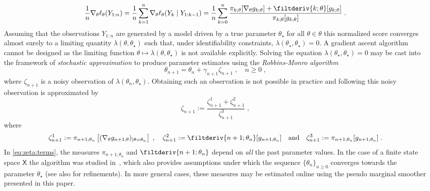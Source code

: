 \documentclass{article}
\newcommand{\md}[1]{g_{#1}}
\newcommand{\logllh}[1]{\ell_{#1}}
\newcommand{\pred}[1]{\pi_{#1}}
\newcommand{\parvec}{\theta}
\newcommand{\deriv}{\nabla_{\parvec}}
\newcommand{\set}[1]{\mathsf{#1}}
\newcommand{\eqdef}{\ensuremath{:=}}
\newcommand{\eqsp}{\;}
\begin{document}
\[
\frac{1}{n} \deriv \logllh{\parvec}(Y_{1:n}) = \frac{1}{n} \sum_{k = 1}^n \deriv \logllh{\parvec}(Y_k \mid Y_{1:k - 1})  
=  \frac{1}{n} \sum_{k = 0}^n \frac{\pred{k;\parvec}[\deriv \md{k;\parvec}] + \filtderiv{k;\parvec}[\md{k;\parvec}]}{\pred{k;\parvec}[\md{k;\parvec}]}\eqsp.
\]
Assuming that the observations $Y_{1:n}$ are generated by a model driven by a true parameter $\parvec_{\star}$ for all $\parvec\in\parvec$ this normalized score converges almost surely to a limiting quantity $\lambda(\parvec, \parvec_{\star})$ such that, under identifiability constraints, $\lambda(\parvec_{\star}, \parvec_{\star}) = 0$. A gradient ascent algorithm cannot be designed as the limiting function $\parvec \mapsto \lambda(\parvec, \parvec_{\star})$ is not available explicitly. Solving the equation $\lambda(\parvec_{\star}, \parvec_{\star}) = 0$ may be cast into the framework of \emph{stochastic approximation} to produce parameter estimates using the \emph{Robbins-Monro algorithm}
\begin{equation}
\label{eq:par:update}
\parvec_{n+1} = \parvec_n + \gamma_{n+1} \zeta_{n+1}\eqsp, \quad n\geqslant 0\eqsp, 
\end{equation}
where $\zeta_{n+1}$ is a noisy observation of $\lambda(\parvec_n, \parvec_{\star})$. Obtaining such an observation is not possible in practice and following \cite{olsson:westerborn:2017} this noisy observation is approximated by 
\begin{equation} 
\label{eq:def:zeta}
\zeta_{n + 1} \eqdef \frac{\zeta^{1}_{n+1} + \zeta^{2}_{n+1}}{\zeta^{3}_{n+1}}\eqsp,
\end{equation}
where
\begin{equation} 
\label{eq:zeta:terms}
\zeta^{1}_{n+1} \eqdef \pred{n+1;\parvec_n} \left[ (\deriv \md{n+1;\parvec})_{|{\parvec = \parvec_n}} \right]\eqsp,  \quad \zeta^{2}_{n+1} \eqdef \filtderiv{n+1;\parvec_n}[\md{n + 1;\parvec_n}]\quad \mbox{and} \quad\zeta^{3}_{n+1} \eqdef \pred{n+1;\parvec_n}[\md{n + 1;\parvec_n}]\eqsp.
\end{equation}
In \eqref{eq:zeta:terms}, the measures $\pred{n+1;\parvec_n}$ and $\filtderiv{n+1;\parvec_n}$ depend on \emph{all} the past parameter values. In the case of a finite state space $\set{X}$ the algorithm was studied in~\cite{legland:mevel:1997}, which also provides assumptions under which the sequence $\{\parvec_{n}\}_{n\geqslant 0}$ converges towards the parameter $\parvec_{\star}$ (see also \cite{tadic:2010} for refinements). In more general cases, these measures may be estimated online using the pseudo marginal smoother presented in this paper.
\end{document}
